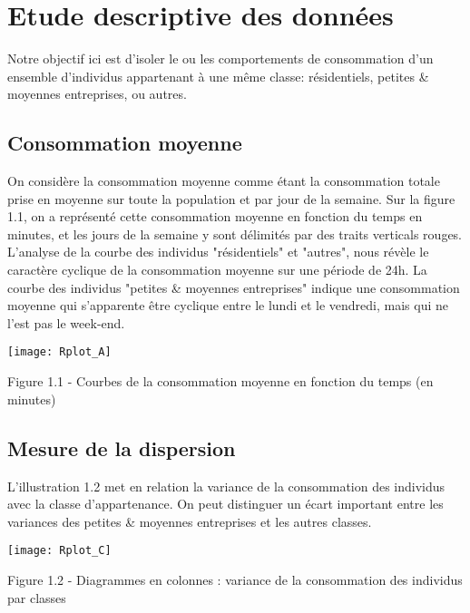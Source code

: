 \documentclass[11pt,fleqn]{book} %
\begin{document}

\section{Etude descriptive des données}

Notre objectif ici est d'isoler le ou les comportements de consommation d'un ensemble d'individus appartenant à une même classe: résidentiels, petites \& moyennes entreprises, ou autres. 

\subsection{Consommation moyenne}
On considère la consommation moyenne comme étant la consommation totale prise en moyenne sur toute la population et par jour de la semaine. Sur la figure 1.1, on a représenté cette consommation moyenne en fonction du temps en minutes, et les jours de la semaine y sont délimités par des traits verticals rouges. 
L'analyse de la courbe des individus "résidentiels" et "autres", nous révèle le caractère cyclique de la consommation moyenne sur une période de 24h. La courbe des individus "petites \& moyennes entreprises" indique une consommation moyenne qui s'apparente être cyclique entre le lundi et le vendredi, mais qui ne l'est pas le week-end.



\texttt{[image: Rplot\_A]}
 \begin{center} Figure 1.1 - Courbes de la consommation moyenne en fonction du temps (en minutes) \end{center}


\subsection{Mesure de la dispersion}
L'illustration 1.2 met en relation la variance de la consommation des individus avec la classe d'appartenance. On peut distinguer un écart important entre les variances des petites \& moyennes entreprises et les autres classes.  


\texttt{[image: Rplot\_C]}
 \begin{center} Figure 1.2 -  Diagrammes en colonnes : variance de la consommation des individus par classes  \end{center}
 
\end{document}
